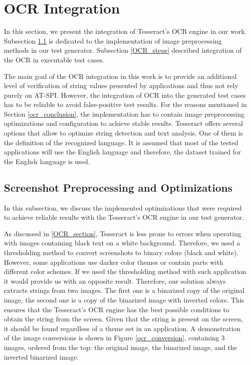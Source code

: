 
\section{OCR Integration}
In this section, we present the integration of Tesseract's OCR engine in our work. Subsection \ref{OCR_optimizations} is dedicated to the implementation of image preprocessing methods in our test generator. Subsection \ref{OCR_steps} described integration of the OCR in executable test cases.  

The main goal of the OCR integration in this work is to provide an additional level of verification of string values presented by applications and thus not rely purely on AT-SPI.
However, the integration of OCR into the generated test cases has to be reliable to avoid false-positive test results. For the reasons mentioned in Section \ref{ocr_conclusion}, the implementation has to contain image preprocessing optimizations and configuration to achieve stable results. Tesseract offers several options that allow to optimize string detection and text analysis. One of them is the definition of the recognized language. It is assumed that most of the tested applications will use the English language and therefore, the dataset trained for the English language is used.

\subsection{Screenshot Preprocessing and Optimizations}\label{OCR_optimizations}
In this subsection, we discuss the implemented optimizations that were required to achieve reliable results with the Tesseract's OCR engine in our test generator.

As discussed in \ref{OCR_section}, Tesseract is less prone to errors when operating with images containing black text on a white background. Therefore, we used a thresholding method to convert screenshots to binary colors (black and white). However, some applications use darker color themes or contain parts with different color schemes. If we used the thresholding method with such application it would provide us with an opposite result. Therefore, our solution always extracts strings from two images. The first one is a binarized copy of the original image, the second one is a copy of the binarized image with inverted colors. This ensures that the Tesseract's OCR engine has the best possible conditions to obtain the string from the screen. Given that the string is present on the screen, it should be found regardless of a theme set in an application. A demonstration of the image conversions is shown in Figure \ref{ocr_conversion}, containing 3 images, ordered from the top: the original image, the binarized image, and the inverted binarized image. 

